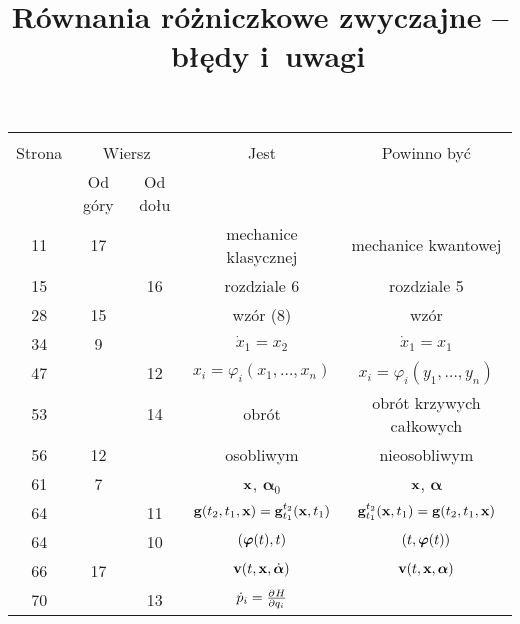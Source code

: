\documentclass[a4paper,11pt]{article}
\title{Równania różniczkowe zwyczajne --~błędy i~uwagi}
\begin{document}



\maketitle %





\begin{center}
  \begin{tabular}{|c|c|c|c|c|}
    \hline
    & \multicolumn{2}{c|}{} & & \\
    Strona & \multicolumn{2}{c|}{Wiersz} & Jest
                              & Powinno być \\ \cline{2-3}
    & Od góry & Od dołu & & \\
    \hline
    11  & 17 & & mechanice klasycznej & mechanice kwantowej \\
    15  & & 16 & rozdziale 6 & rozdziale 5 \\
    28  & 15 & & wzór (8) & wzór \\
    34  &  9 & & $\dot{ x }_{ 1 } = x_{ 2 }$ & $\dot{ x }_{ 1 } = x_{ 1 }$ \\
    47  & & 12 & $x_{ i } = \varphi_{ i }( x_{ 1 }, \ldots, x_{ n } )$
           & $x_{ i } = \varphi_{ i }( y_{ 1 }, \ldots, y_{ n } )$ \\
    53  & & 14 & obrót & obrót krzywych całkowych \\
    56  & 12 & & osobliwym & nieosobliwym \\
    61  &  7 & & $\mathbf{x}$, $\boldsymbol{\alpha}_{ 0 }$
           & $\mathbf{x}$, $\boldsymbol{\alpha}$ \\
    64  & & 11 & $\mathbf{g}( t_{ 2 }, t_{ 1 }, \mathbf{x} )
                = \mathbf{g}^{ t_{ 2 } }_{ t_{ 1 } }( \mathbf{x}, t_{ 1 } )$
           & $\mathbf{g}^{ t_{ 2 } }_{ t_{ 1 } }( \mathbf{x}, t_{ 1 } )
             = \mathbf{g}( t_{ 2 }, t_{ 1 }, \mathbf{x} )$ \\
    64  & & 10 & $( \boldsymbol{\varphi}( t ), t )$ & $( t, \boldsymbol{\varphi}( t ) )$ \\
    66  & 17 & & $\mathbf{v}( t, \mathbf{x}, \dot{ \boldsymbol{\alpha} } )$
           & $\mathbf{v}( t, \mathbf{x}, \boldsymbol{\alpha} )$ \\
    70  & & 13 & $\dot{ p }_{ i } = \frac{ \partial^{   } {  H  } }{ \partial {  q_{ i }  }^{   } }$

\end{tabular}
\end{center}
\end{document}
